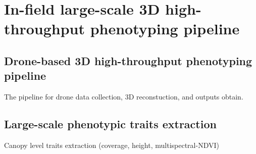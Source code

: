 \chapter{In-field large-scale 3D high-throughput phenotyping pipeline}

\section{Drone-based 3D high-throughput phenotyping pipeline}

The pipeline for drone data collection, 3D reconstuction, and outputs obtain.


\section{Large-scale phenotypic traits extraction}

Canopy level traits extraction (coverage, height, multispectral-NDVI)


\newpage



\newpage
